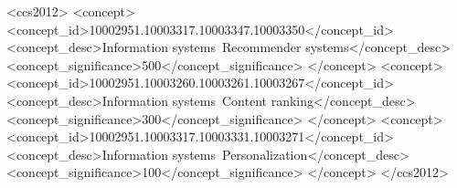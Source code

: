 \documentclass[sigconf]{acmart}
\begin{document}
%
%
\begin{CCSXML}
<ccs2012>
<concept>
<concept_id>10002951.10003317.10003347.10003350</concept_id>
<concept_desc>Information systems~Recommender systems</concept_desc>
<concept_significance>500</concept_significance>
</concept>
<concept>
<concept_id>10002951.10003260.10003261.10003267</concept_id>
<concept_desc>Information systems~Content ranking</concept_desc>
<concept_significance>300</concept_significance>
</concept>
<concept>
<concept_id>10002951.10003317.10003331.10003271</concept_id>
<concept_desc>Information systems~Personalization</concept_desc>
<concept_significance>100</concept_significance>
</concept>
</ccs2012>
\end{CCSXML}





\maketitle




 
\end{document}
